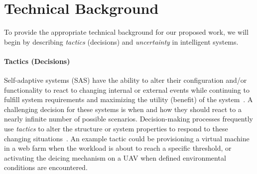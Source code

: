 \documentclass{article}
\begin{document}








\section{Technical Background}



To provide the appropriate technical background for our proposed work, we will begin by describing \emph{tactics} (decisions) and \emph{uncertainty} in intelligent systems.

\paragraph{Tactics (Decisions)}Self-adaptive systems (SAS) have the ability to alter their configuration and/or functionality to react to changing internal or external events while continuing to fulfill system requirements and maximizing the utility (benefit) of the system~\cite{moreno2017decision}. A challenging decision for these systems is when and how they should react to a nearly infinite number of possible scenarios. Decision-making processes frequently use \emph{tactics} to alter the structure or system properties to respond to these changing situations~\cite{moreno2017adaptation}. An example tactic could be provisioning a virtual machine in a web farm when the workload is about to reach a specific threshold, or activating the deicing mechanism on a UAV when defined environmental conditions are encountered.
\end{document}
